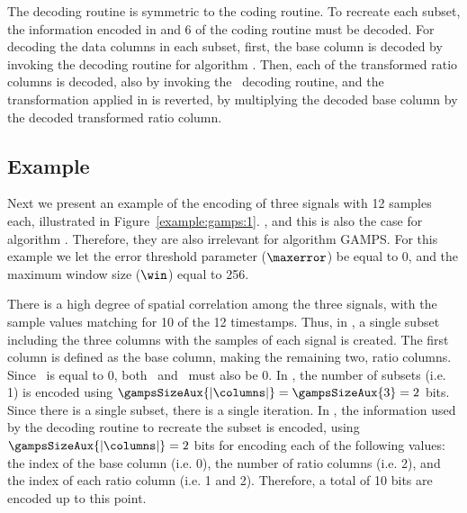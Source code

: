 The decoding routine is symmetric to the coding routine. To recreate each subset, the information encoded in  and 6 of the coding routine must be decoded. For decoding the data columns in each subset, first, the base column is decoded by invoking the decoding routine for algorithm \apcaF. Then, each of the transformed ratio columns is decoded, also by invoking the \apcaF\ decoding routine, and the transformation applied in  is reverted, by multiplying the decoded base column by the decoded transformed ratio column.




\subsection{Example}
\label{algo:gamps:example}


Next we present an example of the encoding of three signals with 12 samples each, illustrated in Figure~\ref{example:gamps:1}. , and this is also the case for algorithm \apcaF. Therefore, they are also irrelevant for algorithm GAMPS. For this example we let the error threshold parameter ($\maxerror$) be equal to 0, and the maximum window size ($\win$) equal to 256.


\vspace{+5pt}


\clearpage


There is a high degree of spatial correlation among the three signals, with the sample values matching for 10 of the 12 timestamps. Thus, in , a single subset including the three columns with the samples of each signal is created. The first column is defined as the base column, making the remaining two, ratio columns. Since \maxerror\ is equal to 0, both \epsilonB\ and \epsilonR\ must also be 0. In , the number of subsets (i.e. 1) is encoded using $\gampsSizeAux{|\columns|}=\gampsSizeAux{3}=2$ bits. Since there is a single subset, there is a single iteration. In , the information used by the decoding routine to recreate the subset is encoded, using $\gampsSizeAux{|\columns|}=2$ bits for encoding each of the following values: the index of the base column (i.e. 0), the number of ratio columns (i.e. 2), and the index of each ratio column (i.e. 1 and 2). Therefore, a total of 10 bits are encoded up to this point.


